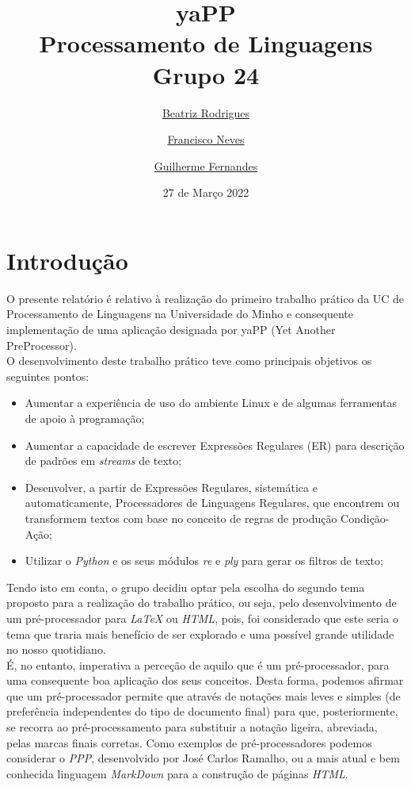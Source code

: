 \documentclass{article}
\begin{document}
\author{\href{https://github.com/beasrodrigues24}{Beatriz Rodrigues}  \and \href{https://github.com/franl08}{Francisco Neves}  \and \href{https://github.com/zer0-5}{Guilherme Fernandes}}
\date{27 de Março 2022}
\title{\LARGE \textbf{yaPP}\\
    \Large Processamento de Linguagens\\
    \large Grupo 24 \\
}
\maketitle
\section{Introdução}
O presente relatório é relativo à realização do primeiro trabalho prático da UC de Processamento de Linguagens na Universidade do Minho e consequente implementação de uma aplicação designada por yaPP (Yet Another PreProcessor).\\
 O desenvolvimento deste trabalho prático teve como principais objetivos os seguintes pontos: 
\begin{itemize}
\item Aumentar a experiência de uso do ambiente Linux e de algumas ferramentas de apoio à programação;
\item Aumentar a capacidade de escrever Expressões Regulares (ER) para descrição de padrões em \textit{streams} de texto;
\item Desenvolver, a partir de Expressões Regulares, sistemática e automaticamente, Processadores de Linguagens Regulares, que encontrem ou transformem textos com base no conceito de regras de produção Condição-Ação;
\item Utilizar o \textit{Python} e os seus módulos \textit{re} e \textit{ply} para gerar os filtros de texto;
\end{itemize}
 Tendo isto em conta, o grupo decidiu optar pela escolha do segundo tema proposto para a realização do trabalho prático, ou seja, pelo desenvolvimento de um pré-processador para \textit{LaTeX} ou \textit{HTML}, pois, foi considerado que este seria o tema que traria mais benefício de ser explorado e uma possível grande utilidade no nosso quotidiano.\\
 É, no entanto, imperativa a perceção de aquilo que é um pré-processador, para uma consequente boa aplicação dos seus conceitos. Desta forma, podemos afirmar que um pré-processador permite que através de notações mais leves e simples (de preferência independentes do tipo de documento final) para que, posteriormente, se recorra ao pré-processamento para substituir a notação ligeira, abreviada, pelas marcas finais corretas. Como exemplos de pré-processadores podemos considerar o \textit{PPP}, desenvolvido por José Carlos Ramalho, ou a mais atual e bem conhecida linguagem \textit{MarkDown} para a construção de páginas \textit{HTML}.\\
\end{document}
